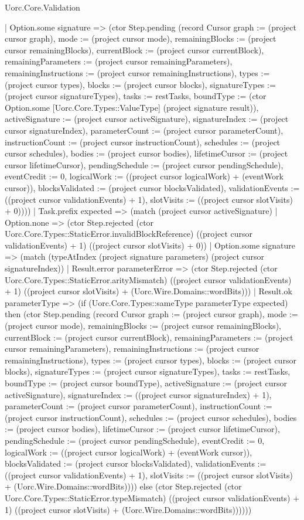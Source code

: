 \begin{lexlean}{Uorc.Core.Validation}
\begin{semanticmodule}
{        | Option.some signature => (ctor Step.pending (record Cursor {graph := (project cursor graph), mode := (project cursor mode), remainingBlocks := (project cursor remainingBlocks), currentBlock := (project cursor currentBlock), remainingParameters := (project cursor remainingParameters), remainingInstructions := (project cursor remainingInstructions), types := (project cursor types), blocks := (project cursor blocks), signatureTypes := (project cursor signatureTypes), tasks := restTasks, boundType := (ctor Option.some [Uorc.Core.Types::ValueType] (project signature result)), activeSignature := (project cursor activeSignature), signatureIndex := (project cursor signatureIndex), parameterCount := (project cursor parameterCount), instructionCount := (project cursor instructionCount), schedules := (project cursor schedules), bodies := (project cursor bodies), lifetimeCursor := (project cursor lifetimeCursor), pendingSchedule := (project cursor pendingSchedule), eventCredit := 0, logicalWork := ((project cursor logicalWork) + (eventWork cursor)), blocksValidated := (project cursor blocksValidated), validationEvents := ((project cursor validationEvents) + 1), slotVisits := ((project cursor slotVisits) + 0)})))
      | Task.prefix expected => (match (project cursor activeSignature)
        | Option.none => (ctor Step.rejected (ctor Uorc.Core.Types::StaticError.invalidBlockReference) ((project cursor validationEvents) + 1) ((project cursor slotVisits) + 0))
        | Option.some signature => (match (typeAtIndex (project signature parameters) (project cursor signatureIndex))
          | Result.error parameterError => (ctor Step.rejected (ctor Uorc.Core.Types::StaticError.arityMismatch) ((project cursor validationEvents) + 1) ((project cursor slotVisits) + (Uorc.Wire.Domains::wordBits)))
          | Result.ok parameterType => (if (Uorc.Core.Types::sameType parameterType expected) then (ctor Step.pending (record Cursor {graph := (project cursor graph), mode := (project cursor mode), remainingBlocks := (project cursor remainingBlocks), currentBlock := (project cursor currentBlock), remainingParameters := (project cursor remainingParameters), remainingInstructions := (project cursor remainingInstructions), types := (project cursor types), blocks := (project cursor blocks), signatureTypes := (project cursor signatureTypes), tasks := restTasks, boundType := (project cursor boundType), activeSignature := (project cursor activeSignature), signatureIndex := ((project cursor signatureIndex) + 1), parameterCount := (project cursor parameterCount), instructionCount := (project cursor instructionCount), schedules := (project cursor schedules), bodies := (project cursor bodies), lifetimeCursor := (project cursor lifetimeCursor), pendingSchedule := (project cursor pendingSchedule), eventCredit := 0, logicalWork := ((project cursor logicalWork) + (eventWork cursor)), blocksValidated := (project cursor blocksValidated), validationEvents := ((project cursor validationEvents) + 1), slotVisits := ((project cursor slotVisits) + (Uorc.Wire.Domains::wordBits))})) else (ctor Step.rejected (ctor Uorc.Core.Types::StaticError.typeMismatch) ((project cursor validationEvents) + 1) ((project cursor slotVisits) + (Uorc.Wire.Domains::wordBits))))))
}
\end{semanticmodule}
\end{lexlean}
